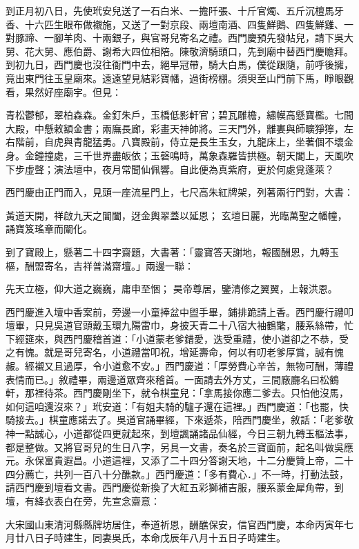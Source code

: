 到正月初八日，先使玳安兒送了一石白米、一擔阡張、十斤官燭、五斤沉檀馬牙香、十六匹生眼布做襯施，又送了一對京段、兩壇南酒、四隻鮮鵝、四隻鮮雞、一對豚蹄、一腳羊肉、十兩銀子，與官哥兒寄名之禮。西門慶預先發帖兒，請下吳大舅、花大舅、應伯爵、謝希大四位相陪。陳敬濟騎頭口，先到廟中替西門慶瞻拜。到初九日，西門慶也沒往衙門中去，絕早冠帶，騎大白馬，僕從跟隨，前呼後擁，竟出東門往玉皇廟來。遠遠望見結彩寶幡，過街榜棚。須臾至山門前下馬，睜眼觀看，果然好座廟宇。但見：

青松鬱郁，翠柏森森。金釘朱戶，玉橋低影軒官；碧瓦雕檐，繡幙高懸寶檻。七間大殿，中懸敕額金書；兩廡長廊，彩畫天神帥將。三天門外，離婁與師曠猙獰，左右階前，自虎與青龍猛勇。八寶殿前，侍立是長生玉女，九龍床上，坐著個不壞金身。金鐘撞處，三千世界盡皈依；玉磬鳴時，萬象森羅皆拱極。朝天閣上，天風吹下步虛聲；演法壇中，夜月常聞仙佩響。自此便為真紫府，更於何處覓蓬萊？

西門慶由正門而入，見頭一座流星門上，七尺高朱紅牌架，列著兩行門對，大書：

黃道天開，祥啟九天之閶闔，迓金輿翠蓋以延恩；
玄壇日麗，光臨萬聖之幡幢，誦寶笈瑤章而闡化。

到了寶殿上，懸著二十四字齋題，大書著：「靈寶答天謝地，報國酬恩，九轉玉樞，酬盟寄名，吉祥普滿齋壇。」兩邊一聯：

先天立極，仰大道之巍巍，庸申至悃；
昊帝尊居，鑒清修之翼翼，上報洪恩。

西門慶進入壇中香案前，旁邊一小童捧盆中盥手畢，鋪排跪請上香。西門慶行禮叩壇畢，只見吳道官頭戴玉環九陽雷巾，身披天青二十八宿大袖鶴氅，腰系絲帶，忙下經筵來，與西門慶稽首道：「小道蒙老爹錯愛，迭受重禮，使小道卻之不恭，受之有愧。就是哥兒寄名，小道禮當叩祝，增延壽命，何以有叨老爹厚賞，誠有愧赧。經襯又且過厚，令小道愈不安。」西門慶道：「厚勞費心辛苦，無物可酬，薄禮表情而已。」敘禮畢，兩邊道眾齊來稽首。一面請去外方丈，三間廠廳名曰松鶴軒，那裡待茶。西門慶剛坐下，就令棋童兒：「拿馬接你應二爹去。只怕他沒馬，如何這咱還沒來？」玳安道：「有姐夫騎的驢子還在這裡。」西門慶道：「也罷，快騎接去。」棋童應諾去了。吳道官誦畢經，下來遞茶，陪西門慶坐，敘話：「老爹敬神一點誠心，小道都從四更就起來，到壇諷誦諸品仙經，今日三朝九轉玉樞法事，都是整做。又將官哥兒的生日八字，另具一文書，奏名於三寶面前，起名叫做吳應元。永保富貴遐昌。小道這裡，又添了二十四分答謝天地，十二分慶贊上帝，二十四分薦亡，共列一百八十分醮款。」西門慶道：「多有費心．」不一時，打動法鼓，請西門慶到壇看文書。西門慶從新換了大紅五彩獅補吉服，腰系蒙金犀角帶，到壇，有絳衣表白在旁，先宣念齋意：

大宋國山東清河縣縣牌坊居住，奉道祈恩，酬醮保安，信官西門慶，本命丙寅年七月廿八日子時建生，同妻吳氏，本命戊辰年八月十五日子時建生。

